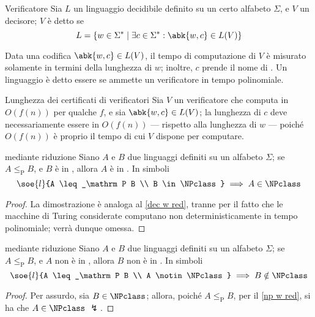 \documentclass[a4paper, 12pt]{report}
\begin{document}
    \begin{frameddefn}{Verificatore}
        Sia $L$ un linguaggio decidibile definito su un certo alfabeto $\Sigma$, e $V$ un decisore; $V$ è detto  se $$L = \{w \in \Sigma^* \mid \exists c \in \Sigma^* : \abk{w, c} \in L(V)\}$$

        Data una codifica $\abk{w, c} \in L(V)$, il tempo di computazione di $V$ è misurato solamente in termini della lunghezza di $w$; inoltre, $c$ prende il nome di . Un linguaggio è detto essere  se ammette un verificatore in tempo polinomiale.
    \end{frameddefn}

    \begin{framedobs}{Lunghezza dei certificati di verificatori}
        Sia $V$ un verificatore che computa in $O(f(n))$ per qualche $f$, e sia $\abk{w, c} \in L(V)$; la lunghezza di $c$ deve necessariamente essere in $O(f(n))$ --- rispetto alla lunghezza di $w$ --- poiché $O(f(n))$ è proprio il tempo di cui $V$ dispone per computare.
    \end{framedobs}

    \begin{framedthm}[label={np w red}]{\NPclass mediante riduzione}
        Siano $A$ e $B$ due linguaggi definiti su un alfabeto $\Sigma$; se $A \leq_\mathrm P B$, e $B$ è in \NPclass, allora $A$ è in \NPclass. In simboli $$\soe{l}{A \leq_\mathrm P B \\ B \in \NPclass} \implies A \in \NPclass$$
    \end{framedthm}

    \begin{proof}
        La dimostrazione è analoga al \cref{dec w red}, tranne per il fatto che le macchine di Turing considerate computano non deterministicamente in tempo polinomiale; verrà dunque omessa.
    \end{proof}

    \begin{framedcor}[label={np with red cor}]{\NPclass mediante riduzione}
        Siano $A$ e $B$ due linguaggi definiti su un alfabeto $\Sigma$; se $A \leq_\mathrm P B$, e $A$ non è in \NPclass, allora $B$ non è in \NPclass. In simboli $$\soe{l}{A \leq_\mathrm P B \\ A \notin \NPclass} \implies B \notin \NPclass$$
    \end{framedcor}

    \begin{proof}
        Per assurdo, sia $B \in \NPclass$; allora, poiché $A \leq_\mathrm P B$, per il \cref{np w red}, si ha che $A \in \NPclass$ $\lightning$.
    \end{proof}
\end{document}
